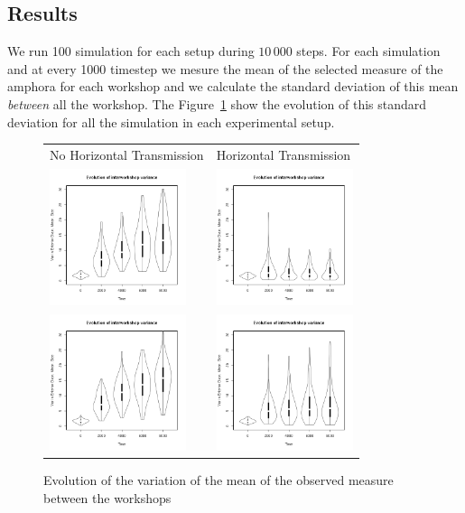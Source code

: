 \documentclass[a4paper]{article}
\begin{document}
\subsection{Results}
We run 100 simulation for each setup during $10\,000$ steps. For each simulation and at every 1000 timestep we mesure the mean of the selected measure of the amphora for each workshop and we calculate the standard deviation of this mean \emph{between} all the workshop. The Figure~\ref{fig:resmod} show the evolution of  this standard deviation for all the simulation in each experimental setup.
    \begin{figure}[h!]
    \centering
	\begin{tabular}{m{4cm}m{4cm}}
	    {\tiny \hspace{.4cm}No Horizontal Transmission} & {\centering\tiny Horizontal Transmission }\\
	    \includegraphics[height=4cm]{images/lineNC.png}
	    &
	    \includegraphics[height=4cm]{images/lineC.png}\\
	    \includegraphics[height=4cm]{images/cubeNC.png}
	    &
	    \includegraphics[height=4cm]{images/cubeC.png}\\
	\end{tabular}
	\caption{Evolution of the variation of the mean of the observed measure between the workshops}
	\label{fig:resmod}
    \end{figure}
 
\end{document}
